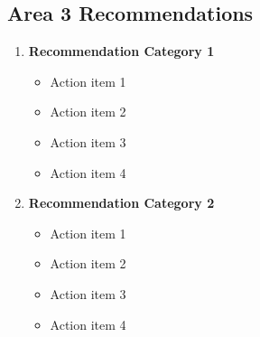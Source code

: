 \documentclass[10pt,a4paper]{article}
\begin{document}
\begin{multicols}{2}
\subsection*{Area 3 Recommendations}
\begin{enumerate}\small
  \item \textbf{Recommendation Category 1}
    \begin{itemize}
      \item Action item 1
      \item Action item 2
      \item Action item 3
      \item Action item 4
    \end{itemize}
  
  \item \textbf{Recommendation Category 2}
    \begin{itemize}
      \item Action item 1
      \item Action item 2
      \item Action item 3
      \item Action item 4
    \end{itemize}
\end{enumerate}
\end{multicols}

\clearpage %
\end{document}
